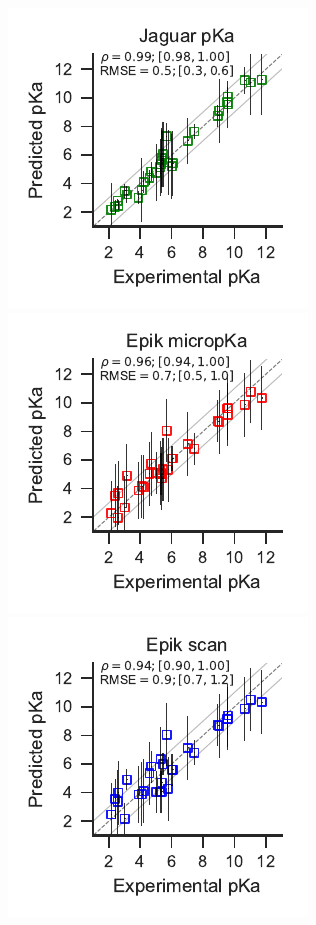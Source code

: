 \documentclass[9pt,lineno,final]{elife}
\begin{document}
\begin{table}[H]
\end{table}



\begin{figure}[hbtp]
\centering
{}
\includegraphics[scale=1.2]{closest_pka_jaguar.pdf}
\includegraphics[scale=1.2]{closest_pka_epik_micropka.pdf}
\includegraphics[scale=1.2]{closest_pka_epik_scan.pdf}

\end{figure}
\end{document}

